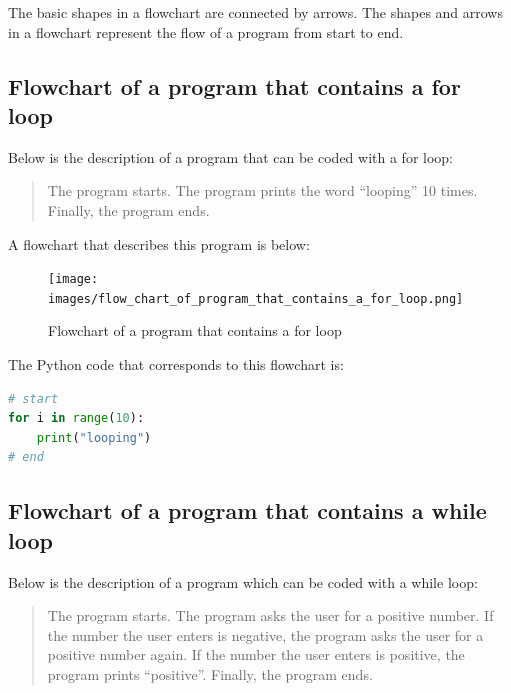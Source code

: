 \documentclass{book}
\begin{document}
The basic shapes in a flowchart are connected by arrows. The shapes and
arrows in a flowchart represent the flow of a program from start to end.
    




    
        \subsection{Flowchart of a program that contains a for
loop}\label{flowchart-of-a-program-that-contains-a-for-loop}
    




    
        Below is the description of a program that can be coded with a for loop:

\begin{quote}
The program starts. The program prints the word ``looping'' 10 times.
Finally, the program ends.
\end{quote}

A flowchart that describes this program is below:

\begin{figure}
\centering
\texttt{[image: images/flow\_chart\_of\_program\_that\_contains\_a\_for\_loop.png]}
\caption{Flowchart of a program that contains a for loop}
\end{figure}

The Python code that corresponds to this flowchart is:

\begin{lstlisting}[language=Python]
# start
for i in range(10):
    print("looping")
# end
\end{lstlisting}
    




    
        \subsection{Flowchart of a program that contains a while
loop}\label{flowchart-of-a-program-that-contains-a-while-loop}
    




    
        Below is the description of a program which can be coded with a while
loop:

\begin{quote}
The program starts. The program asks the user for a positive number. If
the number the user enters is negative, the program asks the user for a
positive number again. If the number the user enters is positive, the
program prints ``positive''. Finally, the program ends.
\end{quote}
\end{document}
